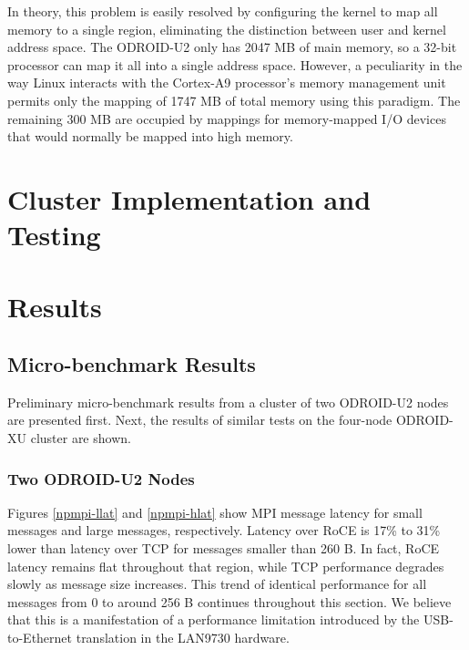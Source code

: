 \documentclass[a4paper]{article}
\begin{document}
In theory, this problem is easily resolved by configuring the kernel to map all
memory to a single region, eliminating the distinction between user and kernel
address space. The ODROID-U2 only has 2047 MB of main memory, so a 32-bit
processor can map it all into a single address space. However, a peculiarity in
the way Linux interacts with the Cortex-A9 processor's memory management unit
permits only the mapping of 1747 MB of total memory using this paradigm. The
remaining 300 MB are occupied by mappings for memory-mapped I/O devices that
would normally be mapped into high memory.


\newpage
\section{\textbf{Cluster Implementation and Testing}}
\label{cluster}

\newpage
\section{\textbf{Results}}
\label{results}

\subsection{\textbf{Micro-benchmark Results}}

Preliminary micro-benchmark results from a cluster of two ODROID-U2 nodes are
presented first. Next, the results of similar tests on the four-node ODROID-XU
cluster are shown.

\subsubsection{\textbf{Two ODROID-U2 Nodes}}

Figures \ref{npmpi-llat} and \ref{npmpi-hlat} show MPI message latency for small
messages and large messages, respectively. Latency over RoCE is 17\% to 31\%
lower than latency over TCP for messages smaller than 260 B. In fact, RoCE
latency remains flat throughout that region, while TCP performance degrades
slowly as message size increases. This trend of identical performance for all
messages from 0 to around 256 B continues throughout this section. We believe
that this is a manifestation of a performance limitation introduced by the
USB-to-Ethernet translation in the LAN9730 hardware.
\end{document}
